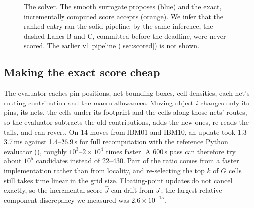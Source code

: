 \begin{figure}[tbp]
\caption{The solver. The smooth surrogate proposes (blue) and the exact,
incrementally computed score accepts (orange). We infer that the ranked entry ran the
solid pipeline; by the same inference, the dashed Lanes B and C, committed before the
deadline, were never scored. The earlier v1 pipeline (\cref{sec:scored}) is not
shown.}
\label{fig:architecture}
\end{figure}

\subsection{Making the exact score cheap}\label{sec:cheap}\label{sec:incremental-analysis}

The evaluator caches pin positions, net bounding boxes, cell densities, each net's
routing contribution and the macro allowances. Moving object $i$ changes only its
pins, its nets, the cells under its footprint and the cells along those nets' routes,
so the evaluator subtracts the old contributions, adds the new ones, re-reads the
tails, and can revert. On 14 moves from IBM01 and IBM10, an update took 1.3--3.7\,ms
against 1.4--26.9\,s for full recomputation with the reference Python evaluator
(\measurement), roughly $10^3$--$2\times10^4$ times faster. A 600\,s pass can
therefore try about $10^5$ candidates instead of 22--430. Part of the ratio comes
from a faster implementation rather than from locality, and re-selecting the top $k$
of $G$ cells still takes time linear in the grid size. Floating-point updates do not
cancel exactly, so the incremental score $\widehat J$ can drift from $J$; the
largest relative component discrepancy we measured was $2.6\times10^{-15}$.

